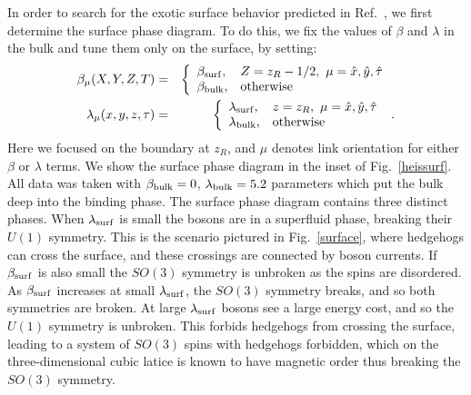 \documentclass[prb,twocolumn]{revtex4-1}
\begin{document}
In order to search for the exotic surface behavior predicted in Ref.~, we first determine the surface phase diagram.
To do this, we fix the values of $\beta$ and $\lambda$ in the bulk and tune them only on the surface, by setting:
\begin{eqnarray}
\beta_\mu(X,Y,Z,T) &=&
\left\{
\begin{array}{ll}
\beta_{\rm surf}, & Z = z_R - 1/2, ~\mu=\hat{x},\hat{y},\hat{\tau}\\
\beta_{\rm bulk}, & {\rm otherwise}
\end{array}\right. ~
\label{bulkvsurf} \\
\lambda_\mu(x,y,z,\tau) &=&
\left\{
\begin{array}{ll}
\lambda_{\rm surf}, & z = z_R, ~\mu=\hat{x},\hat{y},\hat{\tau}\\
\lambda_{\rm bulk}, & {\rm otherwise }
\end{array}\right. ~.
\end{eqnarray}
Here we focused on the boundary at $z_R$, and $\mu$ denotes link orientation for either $\beta$ or $\lambda$ terms.  We show the surface phase diagram in the inset of Fig.~\ref{heissurf}.  All data was taken with $\beta_{\rm bulk}=0$, $\lambda_{\rm bulk}=5.2$ parameters which put the bulk deep into the binding phase.  The surface phase diagram contains three distinct phases. When $\lambda_{\rm surf}$ is small the bosons are in a superfluid phase, breaking their $U(1)$ symmetry. This is the scenario pictured in Fig.~\ref{surface}, where hedgehogs can cross the surface, and these crossings are connected by boson currents. If $\beta_{\rm surf}$ is also small the $SO(3)$ symmetry is unbroken as the spins are disordered. As $\beta_{\rm surf}$ increases at small $\lambda_{\rm surf}$, the $SO(3)$ symmetry breaks, and so both symmetries are broken. At large $\lambda_{\rm surf}$ bosons see a large energy cost, and so the $U(1)$ symmetry is unbroken. This forbids hedgehogs from crossing the surface, leading to a system of $SO(3)$ spins with hedgehogs forbidden, which on the three-dimensional cubic latice is known to have magnetic order thus breaking the $SO(3)$ symmetry.\cite{LauDasgupta, LesikAshvin} 
\end{document}

